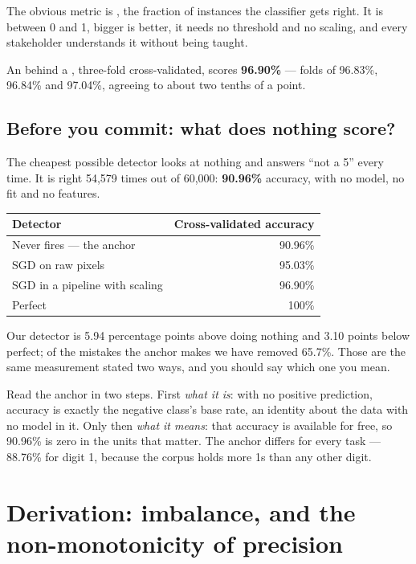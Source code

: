 \documentclass[11pt,a4paper]{article}
\begin{document}
The obvious metric is , the fraction of instances the classifier
gets right. It is between 0 and 1, bigger is better, it needs no threshold and
no scaling, and every stakeholder understands it without being taught.

An  behind a , three-fold
cross-validated, scores \textbf{96.90\%} --- folds of 96.83\%, 96.84\% and
97.04\%, agreeing to about two tenths of a point.

\subsection{Before you commit: what does nothing score?}

The cheapest possible detector looks at nothing and answers ``not a 5'' every
time. It is right 54{,}579 times out of 60{,}000: \textbf{90.96\%} accuracy,
with no model, no fit and no features.

\begin{center}
\small
\begin{tabular}{lr}
\toprule
\textbf{Detector} & \textbf{Cross-validated accuracy} \\
\midrule
Never fires --- the anchor      & 90.96\% \\
SGD on raw pixels               & 95.03\% \\
SGD in a pipeline with scaling  & 96.90\% \\
Perfect                         & 100\% \\
\bottomrule
\end{tabular}
\end{center}

Our detector is 5.94 percentage points above doing nothing and 3.10 points
below perfect; of the mistakes the anchor makes we have removed 65.7\%. Those
are the same measurement stated two ways, and you should say which one you
mean.

Read the anchor in two steps. First \emph{what it is}: with no positive
prediction, accuracy is exactly the negative class's base rate, an identity
about the data with no model in it. Only then \emph{what it means}: that
accuracy is available for free, so 90.96\% is zero in the units that matter.
The anchor differs for every task --- 88.76\% for digit 1, because the corpus
holds more 1s than any other digit.

\section{Derivation: imbalance, and the non-monotonicity of precision}
\end{document}
